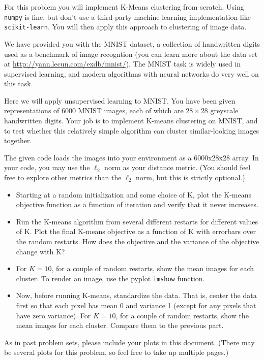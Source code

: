\documentclass[submit]{harvardml}
\begin{document}
\begin{problem}

For this problem you will implement K-Means clustering from
scratch. Using \texttt{numpy} is fine, but don't use a third-party
machine learning implementation like \texttt{scikit-learn}. You will
then apply this approach to clustering of image data.

We have provided you with the MNIST dataset, a collection of
handwritten digits used as a benchmark of image recogntion (you can
learn more about the data set at
\url{http://yann.lecun.com/exdb/mnist/}). The MNIST task is widely
used in supervised learning, and modern algorithms with neural
networks do very well on this task.

Here we will apply unsupervised learning to MNIST. You have been given
representations of 6000 MNIST images, each of which are $28\times28$
greyscale handwritten digits. Your job is to implement K-means
clustering on MNIST, and to test whether this relatively simple
algorithm can cluster similar-looking images together.

The given code loads the images into your environment as a 6000x28x28
array.  In your code, you may use the $\ell_2$ norm as your distance
metric. (You should feel free to explore other metrics than the
$\ell_2$ norm, but this is strictly optional.)

\begin{itemize}

\item Starting at a random initialization and some choice of K, plot
  the K-means objective function as a function of iteration and verify
  that it never increases.

\item Run the K-means algorithm from several different restarts for
  different values of K.  Plot the final K-means objective as a
  function of K with errorbars over the random restarts.  How does the
  objective and the variance of the objective change with K?  
  
\item For $K=10$, for a couple of random restarts, show the mean
  images for each cluster.  To render an image, use the pyplot
  \texttt{imshow} function.

\item Now, before running K-means, standardize the data.  That is,
  center the data first so that each pixel has mean 0 and variance 1
  (except for any pixels that have zero variance).  For $K=10$, for a
  couple of random restarts, show the mean images for each cluster.
  Compare them to the previous part.

\end{itemize}

As in past problem sets, please include your plots in this
document. (There may be several plots for this problem, so feel free
to take up multiple pages.)

\end{problem}
\end{document}
